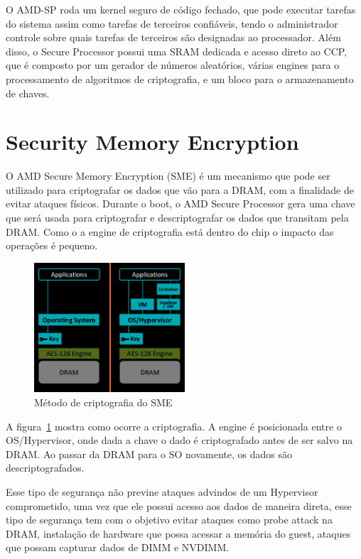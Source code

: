 \documentclass{report}
\begin{document}
O AMD-SP roda um kernel seguro de código fechado, que pode executar tarefas do
sistema assim como tarefas de terceiros confiáveis, tendo o administrador
controle sobre quais tarefas de terceiros são designadas ao processador. Além
disso, o Secure Processor possui uma SRAM dedicada e acesso direto ao CCP, que
é composto por um gerador de números aleatórios, várias engines para o
processamento de algoritmos de criptografia, e um bloco para o armazenamento de
chaves.

\section{Security Memory Encryption}
O AMD Secure Memory Encryption (SME) é um mecanismo que pode ser utilizado para
criptografar os dados que vão para a DRAM, com a finalidade de evitar ataques
físicos. Durante o boot, o AMD Secure Processor gera uma chave que será usada
para criptografar e descriptografar os dados que transitam pela DRAM\@. Como o
a engine de criptografia está dentro do chip o impacto das operações é pequeno.

\begin{figure}[h]
    \centering
    \includegraphics[width=0.5\textwidth]{img/sme}
    \caption{Método de criptografia do SME}\label{sme-1}
\end{figure}

A figura~\ref{sme-1} mostra como ocorre a criptografia. A engine é posicionada
entre o OS/Hypervisor, onde dada a chave o dado é criptografado antes de ser
salvo na DRAM\@. Ao passar da DRAM para o SO novamente, os dados são
descriptografados.

Esse tipo de segurança não previne ataques advindos de um Hypervisor
comprometido, uma vez que ele possui acesso aos dados de maneira direta, esse
tipo de segurança tem com o objetivo evitar ataques como probe attack na
DRAM, instalação de hardware que possa acessar a memória do guest, ataques que
possam capturar dados de DIMM e NVDIMM\@.
\end{document}

